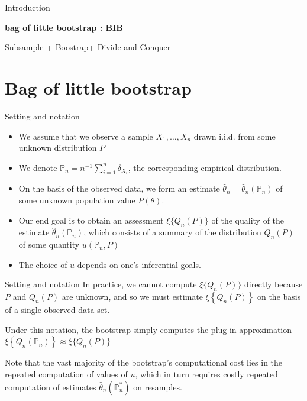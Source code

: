 \documentclass[12pt]{beamer}
\begin{document}
\begin{frame}{Introduction}

{\bf bag of little bootstrap : BIB}

Subsample + Boostrap+ Divide and Conquer
\end{frame}


\section{Bag of little bootstrap}
\begin{frame}{Setting and notation}
\begin{itemize}
\item We assume that we observe a sample $X_1,\dots,X_n$ drawn i.i.d. from some unknown distribution $P$
\item We denote $\mathbb{P}_{n}=n^{-1} \sum_{i=1}^{n} \delta_{X_{i}}$, the corresponding empirical distribution.
\item On the basis of the observed data, we form an estimate $\hat{\theta}_{n}=\hat{\theta}_{n}\left(\mathbb{P}_{n}\right)$ of some unknown population value $P(\theta)$.
\item Our end goal is to obtain an assessment $\xi\{Q_n(P)\}$ of the quality of the estimate $\hat{\theta}_{n}\left(\mathbb{P}_{n}\right)$, which consists of a summary of the distribution $Q_n(P)$ of
some quantity $u(\mathbb{P}_n, P)$ \item The choice of $u$ depends on one’s inferential goals.
\end{itemize}

\end{frame}


\begin{frame}{Setting and notation}
In practice, we cannot compute $\xi\{Q_n(P)\}$ directly because $P$ and $Q_n(P)$ are unknown, and so we must estimate $\xi\left\{Q_{n}(P)\right\}$ on the basis of a single observed
data set.

Under this notation, the bootstrap simply computes the plug-in approximation $\xi\left\{Q_{n}\left(\mathbb{P}_{n}\right)\right\} \approx \xi\{Q_n(P)\}$

Note that the
vast majority of the bootstrap’s computational cost lies in the repeated computation of values
of $u$, which in turn requires costly repeated computation of estimates $\hat{\theta}_n(\mathbb{P}_n^{*})$ on resamples.
\end{frame}
\end{document}
